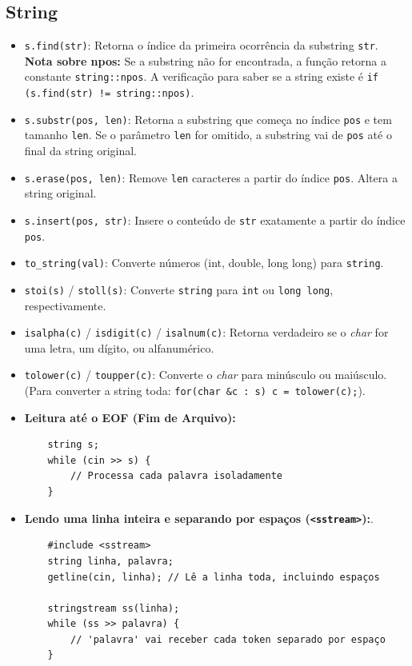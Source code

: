 \subsection{String}

\begin{itemize}
    \item \texttt{s.find(str)}: Retorna o índice da primeira ocorrência da substring \texttt{str}. 
    \newline \textbf{Nota sobre npos:} Se a substring não for encontrada, a função retorna a constante \texttt{string::npos}. A verificação para saber se a string existe é \texttt{if (s.find(str) != string::npos)}.
    \item \texttt{s.substr(pos, len)}: Retorna a substring que começa no índice \texttt{pos} e tem tamanho \texttt{len}. Se o parâmetro \texttt{len} for omitido, a substring vai de \texttt{pos} até o final da string original.
    \item \texttt{s.erase(pos, len)}: Remove \texttt{len} caracteres a partir do índice \texttt{pos}. Altera a string original.
    \item \texttt{s.insert(pos, str)}: Insere o conteúdo de \texttt{str} exatamente a partir do índice \texttt{pos}.
    \item \texttt{to\_string(val)}: Converte números (int, double, long long) para \texttt{string}.
    \item \texttt{stoi(s)} / \texttt{stoll(s)}: Converte \texttt{string} para \texttt{int} ou \texttt{long long}, respectivamente.
\end{itemize}


\begin{itemize}
    \item \texttt{isalpha(c)} / \texttt{isdigit(c)} / \texttt{isalnum(c)}: Retorna verdadeiro se o \textit{char} for uma letra, um dígito, ou alfanumérico.
    \item \texttt{tolower(c)} / \texttt{toupper(c)}: Converte o \textit{char} para minúsculo ou maiúsculo. (Para converter a string toda: \texttt{for(char \&c : s) c = tolower(c);}).
\end{itemize}

\begin{itemize}
    \item \textbf{Leitura até o EOF (Fim de Arquivo):}
    \begin{verbatim}
    string s;
    while (cin >> s) {
        // Processa cada palavra isoladamente
    }
    \end{verbatim}
    
    \item \textbf{Lendo uma linha inteira e separando por espaços (\texttt{<sstream>}):}.
    \begin{verbatim}
    #include <sstream>
    string linha, palavra;
    getline(cin, linha); // Lê a linha toda, incluindo espaços
    
    stringstream ss(linha);
    while (ss >> palavra) {
        // 'palavra' vai receber cada token separado por espaço
    }
    \end{verbatim}
\end{itemize}

